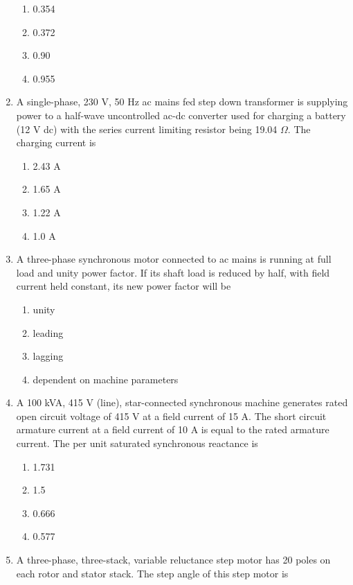\documentclass[journal]{IEEEtran}
\begin{document}
\begin{enumerate}
\begin{enumerate}
     \item 0.354
     \item 0.372
     \item 0.90
     \item 0.955 \\
 \end{enumerate}
\item A single-phase, 230 V, 50 Hz ac mains fed step down transformer  is supplying power to a half-wave uncontrolled ac-dc converter used for charging a battery (12 V dc) with the series current limiting resistor being 19.04 $\Omega$. The charging current is
\begin{enumerate}
    \item 2.43 A
    \item 1.65 A
    \item 1.22 A
    \item 1.0 A \\
\end{enumerate}
\item A three-phase synchronous motor connected to ac mains is running at full load and unity power factor. If its shaft load is reduced by half, with field current held constant, its new power factor will be
\begin{enumerate}
    \item unity
    \item leading
    \item lagging
    \item dependent on machine parameters \\
\end{enumerate}
\item A 100 kVA, 415 V (line), star-connected synchronous machine generates rated open circuit voltage of 415 V at a field current of 15 A. The short circuit armature current at a field current of 10 A is equal to the rated armature current. The per unit saturated synchronous reactance is
\begin{enumerate}
    \item 1.731
    \item 1.5
    \item 0.666
    \item 0.577 \\
\end{enumerate}
\item A three-phase, three-stack, variable reluctance step motor has 20 poles on each rotor and stator stack. The step angle of this step motor is

\end{enumerate}
\end{document}
